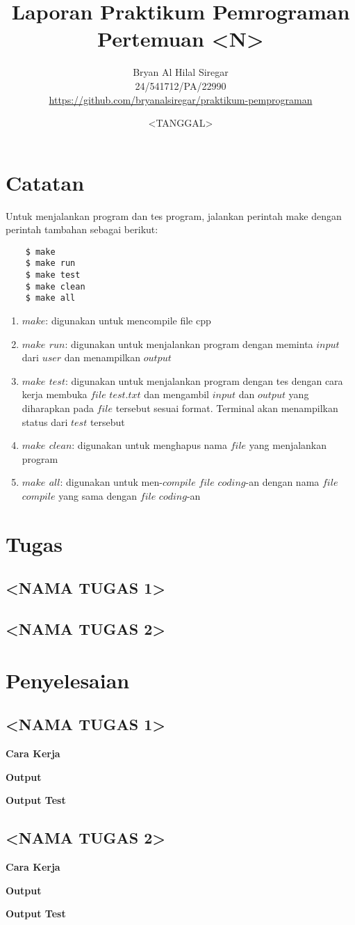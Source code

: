 \documentclass{article}
\title{Laporan Praktikum Pemrograman\\Pertemuan <N>}
\author{Bryan Al Hilal Siregar\\ 24/541712/PA/22990\\ \href{https://github.com/bryanalsiregar/praktikum-pemprograman}{https://github.com/bryanalsiregar/praktikum-pemprograman}}
\date{<TANGGAL>}
\begin{document}
\maketitle

\section{Catatan}

Untuk menjalankan program dan tes program, jalankan perintah make dengan perintah tambahan sebagai berikut:
\begin{verbatim}
    $ make
    $ make run
    $ make test
    $ make clean 
    $ make all
\end{verbatim}

\begin{enumerate}
    \item \textbf{$make$}: digunakan untuk mencompile file cpp
    \item \textbf{$make$ $run$}: digunakan untuk menjalankan program dengan meminta $input$ dari $user$ dan menampilkan $output$
    \item \textbf{$make$ $test$}: digunakan untuk menjalankan program dengan tes dengan cara kerja membuka $file$ $test.txt$ dan mengambil $input$ dan $output$ yang diharapkan pada $file$ tersebut sesuai format. Terminal akan menampilkan status dari $test$ tersebut
    \item \textbf{$make$ $clean$}: digunakan untuk menghapus nama $file$ yang menjalankan program
    \item \textbf{$make$ $all$}: digunakan untuk men-$compile$ $file$ $coding$-an dengan nama $file$ $compile$ yang sama dengan $file$ $coding$-an
\end{enumerate}

\section{Tugas}

\subsection{<NAMA TUGAS 1>}


\subsection{<NAMA TUGAS 2>}

\section{Penyelesaian}

\subsection{<NAMA TUGAS 1>}

\textbf{Cara Kerja}

\textbf{Output}

\textbf{Output Test}

\subsection{<NAMA TUGAS 2>}

\textbf{Cara Kerja}

\textbf{Output}

\textbf{Output Test}
\end{document}
